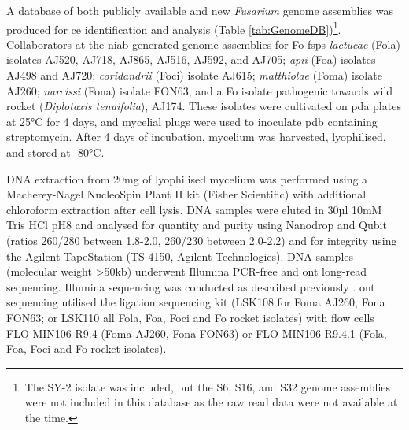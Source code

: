A database of both publicly available and new \textit{Fusarium} genome assemblies was produced for \ac{ce} identification and analysis (Table \ref{tab:GenomeDB})\footnote{The SY-2 isolate was included, but the S6, S16, and S32 genome assemblies were not included in this database as the raw read data were not available at the time.}. Collaborators at the \ac{niab} generated genome assemblies for \ac{Fo} \acp{fsp} \textit{lactucae} (\acs{Fola}) isolates AJ520, AJ718, AJ865, AJ516, AJ592, and AJ705; \textit{apii} (\acs{Foa}) isolates AJ498 and AJ720; \textit{coridandrii} (\acs{Foci}) isolate AJ615; \textit{matthiolae} (\acs{Foma}) isolate AJ260; \textit{narcissi} (\acs{Fona}) isolate FON63; and a \ac{Fo} isolate pathogenic towards wild rocket (\textit{Diplotaxis tenuifolia}), AJ174. These isolates were cultivated on \ac{pda} plates at 25°C for 4 days, and mycelial plugs were used to inoculate \ac{pdb} containing streptomycin. After 4 days of incubation, mycelium was harvested, lyophilised, and stored at -80°C. 

DNA extraction from 20mg of lyophilised mycelium was performed using a Macher\-ey-Nagel NucleoSpin Plant II kit (Fisher Scientific) with additional chloroform extraction after cell lysis. DNA samples were eluted in 30µl 10mM Tris HCl pH8 and analysed for quantity and purity using Nanodrop and Qubit (ratios 260/280 between 1.8-2.0, 260/230 between 2.0-2.2)  and for integrity using the Agilent TapeStation (TS 4150, Agilent Technologies). DNA samples (molecular weight >50kb) underwent Illumina PCR-free and \ac{ont} long-read sequencing. Illumina sequencing was conducted as described previously \parencite{Armitage2018}. \ac{ont} sequencing utilised the ligation sequencing kit (LSK108 for \ac{Foma} AJ260, \ac{Fona} FON63; or LSK110 all \ac{Fola}, \ac{Foa}, \ac{Foci} and \ac{Fo} rocket isolates) with flow cells FLO-MIN106 R9.4 (\ac{Foma} AJ260, \ac{Fona} FON63) or FLO-MIN106 R9.4.1 (\ac{Fola}, \ac{Foa}, \ac{Foci} and \ac{Fo} rocket isolates). 

